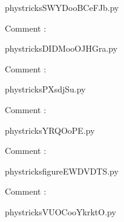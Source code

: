     \newcommand{\CaptionFigSWYDooBCeFJb}{<+Type your caption here+>}
    \begin{center}
        
    \end{center}
    phystricksSWYDooBCeFJb.py

    Comment : 

    \clearpage
    


    \newcommand{\CaptionFigDIDMooOJHGra}{<+Type your caption here+>}
    \begin{center}
        
    \end{center}
    phystricksDIDMooOJHGra.py

    Comment : 

    \clearpage
    


    \newcommand{\CaptionFigPXsdjSu}{<+Type your caption here+>}
    \begin{center}
        
    \end{center}
    phystricksPXsdjSu.py

    Comment : 

    \clearpage
    


    \newcommand{\CaptionFigYRQOoPE}{<+Type your caption here+>}
    \begin{center}
        
    \end{center}
    phystricksYRQOoPE.py

    Comment : 

    \clearpage
    


    \newcommand{\CaptionFigfigureEWDVDTS}{<+Type your caption here+>}
    \begin{center}
        
    \end{center}
    phystricksfigureEWDVDTS.py

    Comment : 

    \clearpage
    


    \newcommand{\CaptionFigVUOCooYkrktO}{<+Type your caption here+>}
    \begin{center}
        
    \end{center}
    phystricksVUOCooYkrktO.py

